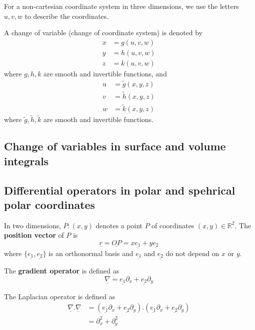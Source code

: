 \begin{definition}
	For a non-cartesian coordinate system in three dimensions, we use the letters $u, v, w$ to describe the coordinates.
\end{definition}

\begin{definition}
	A change of variable (change of coordinate system) is denoted by
	\[
		\begin{aligned}
			x & = g(u, v, w) \\
			y & = h(u, v, w) \\
			z & = k(u, v, w)
		\end{aligned}
	\]
	where $g, h, k$ are smooth and invertible functions, and
	\[
		\begin{aligned}
			u & = \tilde{g}(x, y, z) \\
			v & = \tilde{h}(x, y, z) \\
			w & = \tilde{k}(x, y, z)
		\end{aligned}
	\]
	where $\tilde{g}, \tilde{h}, \tilde{k}$ are smooth and invertible functions.
\end{definition}

\subsection{Change of variables in surface and volume integrals}

\subsection{Differential operators in polar and spehrical polar coordinates}

\begin{definition}
	In two dimensions, $P: (x, y)$ denotes a point $P$ of coordinates $(x, y) \in \mathbb{R}^2$. The \textbf{position vector} of $P$ is
	\[
		\underline{r} = \underline{OP} = x \underline{e_1} + y \underline{e_2}
	\]
	where $\{ \underline{e_1}, \underline{e_2} \}$ is an orthonormal basis and $\underline{e_1}$ and $\underline{e_2}$ do not depend on $x$ or $y$.
\end{definition}

\begin{definition}
	The \textbf{gradient operator} is defined as
	\[
		\underline{\nabla} = \underline{e_1} \partial_x + \underline{e_2} \partial_y
	\]
\end{definition}

\begin{definition}
	The Laplacian operator is defined as
	\[
		\begin{aligned}
			\underline{\nabla} . \underline{\nabla}
				& = (\underline{e_1} \partial_x + \underline{e_2} \partial_y) . (\underline{e_1} \partial_x + \underline{e_2} \partial_y) \\
				& = \partial_x^2 + \partial_y^2
		\end{aligned}
	\]
\end{definition}

